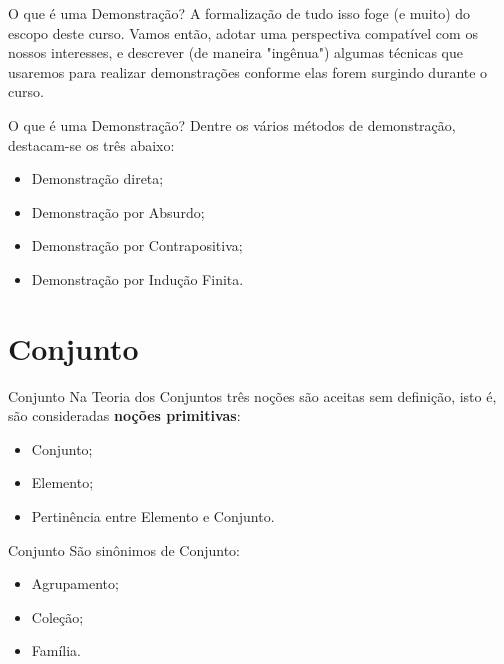 \documentclass[10pt]{beamer}
\renewcommand{\indent}{\hspace*{2em}}
\theoremstyle{plain}
\begin{document}
\begin{frame}{O que é uma Demonstração?}
 \indent A formalização de tudo isso foge (e muito) do escopo deste curso. Vamos então, adotar uma perspectiva compatível com os nossos interesses, e descrever (de maneira "ingênua") algumas técnicas que usaremos para realizar demonstrações conforme elas forem surgindo durante o curso.
\end{frame}


\begin{frame}{O que é uma Demonstração?}
 \indent Dentre os vários métodos de demonstração, destacam-se os três abaixo:
 \begin{itemize}
     \item Demonstração direta;
     \item Demonstração por Absurdo;
     \item Demonstração por Contrapositiva;
     \item Demonstração por Indução Finita.
 \end{itemize}
\end{frame}

\section{Conjunto}

\begin{frame}{Conjunto}
\indent Na Teoria dos Conjuntos três noções são aceitas sem definição, isto é, são consideradas \textbf{noções primitivas}:
\begin{itemize}
    \item Conjunto;
    \item Elemento;
    \item Pertinência entre Elemento e Conjunto.
\end{itemize}
\end{frame}

\begin{frame}{Conjunto}
\indent São sinônimos de Conjunto:
\begin{itemize}
    \item Agrupamento;
    \item Coleção;
    \item Família.
\end{itemize}
\end{frame}
\end{document}
